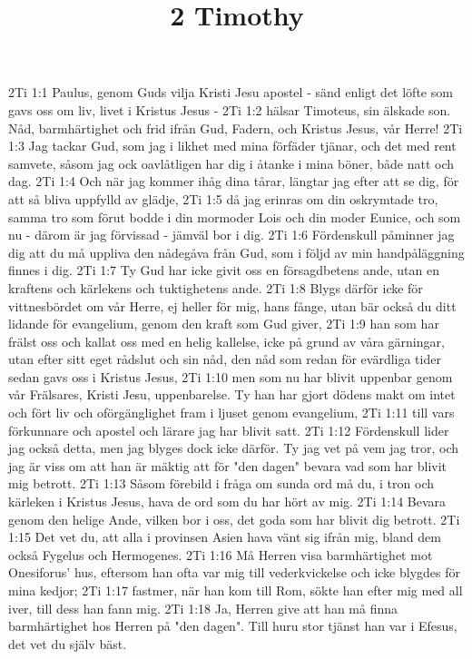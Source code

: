

\title{2 Timothy}

2Ti 1:1  Paulus, genom Guds vilja Kristi Jesu apostel - sänd enligt det löfte som gavs oss om liv, livet i Kristus Jesus -
2Ti 1:2  hälsar Timoteus, sin älskade son. Nåd, barmhärtighet och frid ifrån Gud, Fadern, och Kristus Jesus, vår Herre!
2Ti 1:3  Jag tackar Gud, som jag i likhet med mina förfäder tjänar, och det med rent samvete, såsom jag ock oavlåtligen har dig i åtanke i mina böner, både natt och dag.
2Ti 1:4  Och när jag kommer ihåg dina tårar, längtar jag efter att se dig, för att så bliva uppfylld av glädje,
2Ti 1:5  då jag erinras om din oskrymtade tro, samma tro som förut bodde i din mormoder Lois och din moder Eunice, och som nu - därom är jag förvissad - jämväl bor i dig.
2Ti 1:6  Fördenskull påminner jag dig att du må uppliva den nådegåva från Gud, som i följd av min handpåläggning finnes i dig.
2Ti 1:7  Ty Gud har icke givit oss en försagdbetens ande, utan en kraftens och kärlekens och tuktighetens ande.
2Ti 1:8  Blygs därför icke för vittnesbördet om vår Herre, ej heller för mig, hans fånge, utan bär också du ditt lidande för evangelium, genom den kraft som Gud giver,
2Ti 1:9  han som har frälst oss och kallat oss med en helig kallelse, icke på grund av våra gärningar, utan efter sitt eget rådslut och sin nåd, den nåd som redan för evärdliga tider sedan gavs oss i Kristus Jesus,
2Ti 1:10  men som nu har blivit uppenbar genom vår Frälsares, Kristi Jesu, uppenbarelse. Ty han har gjort dödens makt om intet och fört liv och oförgänglighet fram i ljuset genom evangelium,
2Ti 1:11  till vars förkunnare och apostel och lärare jag har blivit satt.
2Ti 1:12  Fördenskull lider jag också detta, men jag blyges dock icke därför. Ty jag vet på vem jag tror, och jag är viss om att han är mäktig att för "den dagen" bevara vad som har blivit mig betrott.
2Ti 1:13  Såsom förebild i fråga om sunda ord må du, i tron och kärleken i Kristus Jesus, hava de ord som du har hört av mig.
2Ti 1:14  Bevara genom den helige Ande, vilken bor i oss, det goda som har blivit dig betrott.
2Ti 1:15  Det vet du, att alla i provinsen Asien hava vänt sig ifrån mig, bland dem också Fygelus och Hermogenes.
2Ti 1:16  Må Herren visa barmhärtighet mot Onesiforus' hus, eftersom han ofta var mig till vederkvickelse och icke blygdes för mina kedjor;
2Ti 1:17  fastmer, när han kom till Rom, sökte han efter mig med all iver, till dess han fann mig.
2Ti 1:18  Ja, Herren give att han må finna barmhärtighet hos Herren på "den dagen". Till huru stor tjänst han var i Efesus, det vet du själv bäst.
